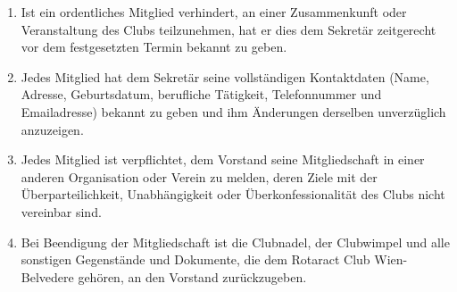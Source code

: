 \documentclass{statutclass}
\begin{document}
\begin{enumerate}
    \item Ist ein ordentliches Mitglied verhindert, an einer Zusammenkunft oder Veranstaltung des Clubs teilzunehmen, hat er dies dem Sekretär zeitgerecht vor dem festgesetzten Termin bekannt zu geben.
    \item Jedes Mitglied hat dem Sekretär seine vollständigen Kontaktdaten (Name, Adresse, Geburtsdatum, berufliche Tätigkeit, Telefonnummer und Emailadresse) bekannt zu geben und ihm Änderungen derselben unverzüglich anzuzeigen.
    \item Jedes Mitglied ist verpflichtet, dem Vorstand seine Mitgliedschaft in einer anderen Organisation oder Verein zu melden, deren Ziele mit der Überparteilichkeit, Unabhängigkeit oder Überkonfessionalität des Clubs nicht vereinbar sind.
    \item Bei Beendigung der Mitgliedschaft ist die Clubnadel, der Clubwimpel und alle sonstigen Gegenstände und Dokumente, die dem Rotaract Club Wien-Belvedere gehören, an den Vorstand zurückzugeben.
\end{enumerate}
\end{document}
